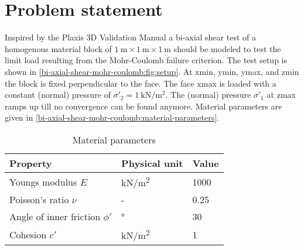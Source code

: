 \section{Problem statement}
\label{bi-axial-shear-mohr-coulomb:sec:problem-statement}

Inspired by the Plaxis 3D Validation Manual a bi-axial shear test of a
homogenous material block of $\SI{1}{\metre} \times \SI{1}{\metre} \times
    \SI{1}{\metre}$ should be modeled to test the limit load resulting from the
Mohr-Coulomb failure criterion. The test setup is shown in
\autoref{bi-axial-shear-mohr-coulomb:fig:setup}. At xmin, ymin, ymax, and zmin
the block is fixed perpendicular to the face. The face xmax is loaded with a
constant (normal) pressure of $\sigma'_2 =
    \qty{1}{\kilo\newton\per\square\metre}$. The (normal) pressure $\sigma'_1$ at
zmax ramps up till no convergence can be found anymore. Material parameters are
given in \autoref{bi-axial-shear-mohr-coulomb:material-parameters}.

\begin{table}[htbp]
    \centering
    \caption{Material parameters}
    \label{bi-axial-shear-mohr-coulomb:material-parameters}
    \begin{tabularx}{\textwidth}{XYY}

        \hline

        Property                        & Physical unit                                         & Value       \\

        \hline

        Youngs modulus $E$              & \si[per-mode = symbol]{\kilo\newton\per\square\metre} &
        \SI{1000}{}                                                                                           \\

        Poisson's ratio $\nu$           & -                                                     & \SI{0.25}{} \\

        Angle of inner friction $\phi'$ & \si[per-mode = symbol]{\degree}                       & \SI{30}{}
        \\

        Cohesion $c'$                   & \si[per-mode = symbol]{\kilo\newton\per\square\metre} & 1           \\

        \hline
    \end{tabularx}
\end{table}

